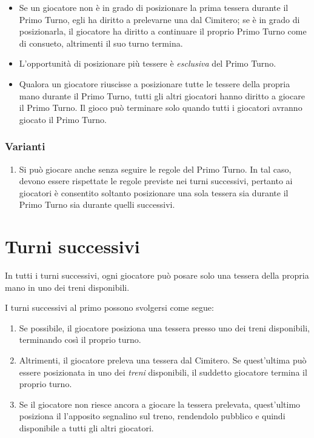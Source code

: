 \documentclass[sigconf,10pt]{acmart}
\begin{document}
\begin{itemize}
\item Se un giocatore non è in grado di posizionare la prima tessera durante il Primo Turno, egli ha diritto a prelevarne una dal Cimitero; se è in grado di posizionarla, il giocatore ha diritto a continuare il proprio Primo Turno come di consueto, altrimenti il suo turno termina.

\item L'opportunità di posizionare più tessere è \textit{esclusiva} del Primo Turno.

\item Qualora un giocatore riuscisse a posizionare tutte le tessere della propria mano durante il Primo Turno, tutti gli altri giocatori hanno diritto a giocare il Primo Turno. Il gioco può terminare solo quando tutti i giocatori avranno giocato il Primo Turno.

\end{itemize}

\subsubsection{Varianti}

\begin{enumerate}
\item Si può giocare anche senza seguire le regole del Primo Turno. In tal caso, devono essere rispettate le regole previste nei turni successivi, pertanto ai giocatori è consentito soltanto posizionare una sola tessera sia durante il Primo Turno sia durante quelli successivi.
\end{enumerate}

\section{Turni successivi}

In tutti i turni successivi, ogni giocatore può posare solo una tessera della propria mano in uno dei treni disponibili. 

I turni successivi al primo possono svolgersi come segue:

\begin{enumerate}
\item Se possibile, il giocatore posiziona una tessera presso uno dei treni disponibili, terminando così il proprio turno.

\item Altrimenti, il giocatore preleva una tessera dal Cimitero. Se quest'ultima può essere posizionata in uno dei \textit{treni} disponibili, il suddetto giocatore termina il proprio turno.

\item Se il giocatore non riesce ancora a giocare la tessera prelevata, quest'ultimo posiziona il l'apposito segnalino sul treno, rendendolo pubblico e quindi disponibile a tutti gli altri giocatori.
\end{enumerate}
\end{document}
